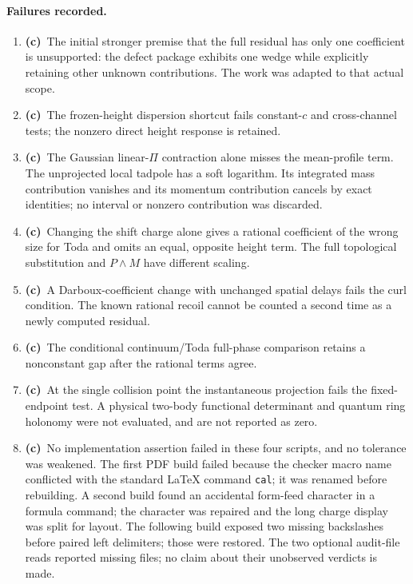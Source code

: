 \documentclass[11pt,a4paper]{article}
\newcommand{\C}{\textbf{(c)}\ }
\newcommand{\file}[1]{\nolinkurl{#1}}
\begin{document}
\paragraph{Failures recorded.}
\begin{enumerate}
\item \C The initial stronger premise that the full residual has only one
coefficient is unsupported: the defect package exhibits one wedge while
explicitly retaining other unknown contributions. The work was adapted to
that actual scope.
\item \C The frozen-height dispersion shortcut fails constant-$c$ and
cross-channel tests; the nonzero direct height response is retained.
\item \C The Gaussian linear-$\Pi$ contraction alone misses the mean-profile
term. The unprojected local tadpole has a soft logarithm. Its integrated
mass contribution vanishes and its momentum contribution cancels by exact
identities; no interval or nonzero contribution was discarded.
\item \C Changing the shift charge alone gives a rational coefficient
of the wrong size for Toda and omits an equal, opposite height term.
The full topological substitution and $P\wedge M$ have different scaling.
\item \C A Darboux-coefficient change with unchanged spatial delays fails
the curl condition. The known rational recoil cannot be counted a second
time as a newly computed residual.
\item \C The conditional continuum/Toda full-phase comparison retains
a nonconstant gap after the rational terms agree.
\item \C At the single collision point the instantaneous projection fails
the fixed-endpoint test. A physical two-body functional determinant and
quantum ring holonomy were not evaluated, and are not reported as zero.
\item \C No implementation assertion failed in these four scripts, and
no tolerance was weakened. The first PDF build failed because the checker
macro name conflicted with the standard LaTeX command \file{cal}; it was
renamed before rebuilding. A second build found an accidental form-feed
character in a formula command; the character was repaired and the long
charge display was split for layout. The following build exposed two
missing backslashes before paired left delimiters; those were restored. The two optional audit-file reads reported
missing files; no claim about their unobserved verdicts is made.
\end{enumerate}
\end{document}
